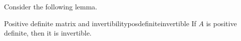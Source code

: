 
Consider the following lemma.

\begin{lemma}{Positive definite matrix and invertibility}{posdefiniteinvertible}
If $A$ is positive definite, then it is invertible.
\end{lemma}

